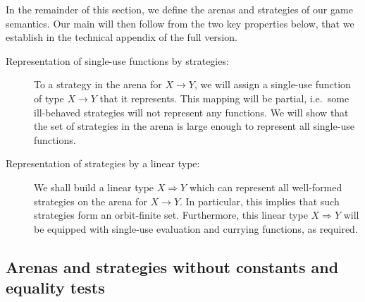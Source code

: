 \documentclass[a4paper,UKenglish,cleveref, autoref, numberwithinsect, thm-restate]{lipics-v2021}
\begin{document}
In the remainder of this section, we define the arenas and strategies of our game semantics. Our main  will then follow from the two key properties below, that we establish in the technical appendix of the full version.
\begin{description}
    \item[Representation of single-use functions by strategies:] To a strategy in the arena for $X \to Y$, we will assign a single-use function of type $X \to Y$ that it represents. This mapping will be partial, i.e.~some ill-behaved strategies will not represent any functions. We will show that the set of strategies in the arena is large enough to represent all single-use functions.
    \item[Representation of strategies by a linear type:] We shall build a linear type $X \Rightarrow Y$ which can represent all well-formed strategies on the arena for $X\to Y$. In particular, this implies that such strategies form an orbit-finite set. Furthermore, this linear type $X\Rightarrow Y$ will be equipped with single-use evaluation and currying functions, as required.
\end{description}

\subsection{Arenas and strategies without constants and equality tests}
\label{sec:arenas-without-constants-and-equality-tests}
\end{document}
